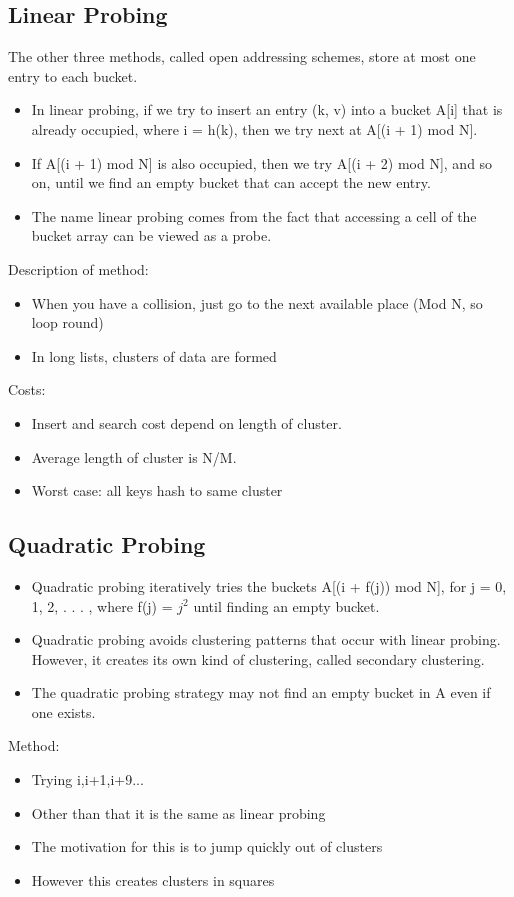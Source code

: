 \documentclass{article}[18pt]
\begin{document}
\subsection{Linear Probing}
The other three methods, called open addressing schemes,
store at most one entry to each bucket.
\begin{itemize}
\item In linear probing, if we try to insert an entry (k, v) into a
bucket A[i] that is already occupied, where i = h(k), then
we try next at A[(i + 1) mod N].
\item If A[(i + 1) mod N] is also occupied, then we try A[(i + 2)
mod N], and so on, until we find an empty bucket that can
accept the new entry.
\item The name linear probing comes from the fact that
accessing a cell of the bucket array can be viewed as a
probe.
\end{itemize}
Description of method:
\begin{itemize}
\item When you have a collision, just go to the next available place (Mod N, so loop round)
\item In long lists, clusters of data are formed
\end{itemize}

Costs:
\begin{itemize}
\item Insert and search cost depend on length of cluster.
\item Average length of cluster is N/M.
\item Worst case: all keys hash to same cluster
\end{itemize}
\subsection{Quadratic Probing}
\begin{itemize}
\item Quadratic probing iteratively tries the buckets
A[(i + f(j)) mod N], for j = 0, 1, 2, . . . , where f(j) = $j^2$
until finding an empty bucket.
\item Quadratic probing avoids clustering patterns that occur
with linear probing. However, it creates its own kind of
clustering, called secondary clustering.
\item The quadratic probing strategy may not find an empty
bucket in A even if one exists.
\end{itemize}
Method:
\begin{itemize}
\item Trying i,i+1,i+9...
\item Other than that it is the same as linear probing
\item The motivation for this is to jump quickly out of clusters
\item However this creates clusters in squares
\end{itemize}
\end{document}
